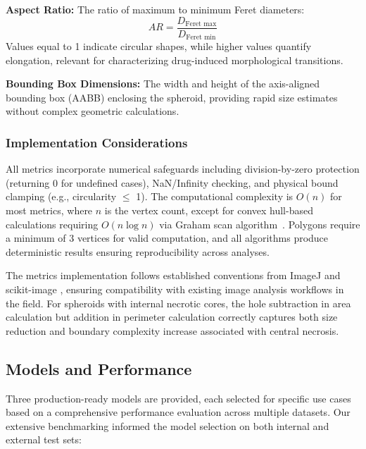 \documentclass[preprint,12pt]{elsarticle}
\begin{document}
\textbf{Aspect Ratio:} The ratio of maximum to minimum Feret diameters:
\begin{equation}
AR = \frac{D_{\text{Feret max}}}{D_{\text{Feret min}}}
\end{equation}
Values equal to 1 indicate circular shapes, while higher values quantify elongation, relevant for characterizing drug-induced morphological transitions.

\textbf{Bounding Box Dimensions:} The width and height of the axis-aligned bounding box (AABB) enclosing the spheroid, providing rapid size estimates without complex geometric calculations.

\subsubsection{Implementation Considerations}

All metrics incorporate numerical safeguards including division-by-zero protection (returning 0 for undefined cases), NaN/Infinity checking, and physical bound clamping (e.g., circularity $\leq$ 1). The computational complexity is $O(n)$ for most metrics, where $n$ is the vertex count, except for convex hull-based calculations requiring $O(n \log n)$ via Graham scan algorithm~\cite{Graham1972}. Polygons require a minimum of 3 vertices for valid computation, and all algorithms produce deterministic results ensuring reproducibility across analyses.

The metrics implementation follows established conventions from ImageJ \cite{Rueden2017} and scikit-image \cite{vanDerWalt2014}, ensuring compatibility with existing image analysis workflows in the field. For spheroids with internal necrotic cores, the hole subtraction in area calculation but addition in perimeter calculation correctly captures both size reduction and boundary complexity increase associated with central necrosis.

\subsection{Models and Performance}

Three production-ready models are provided, each selected for specific use cases based on a comprehensive performance evaluation across multiple datasets. Our extensive benchmarking informed the model selection on both internal and external test sets:
\end{document}
